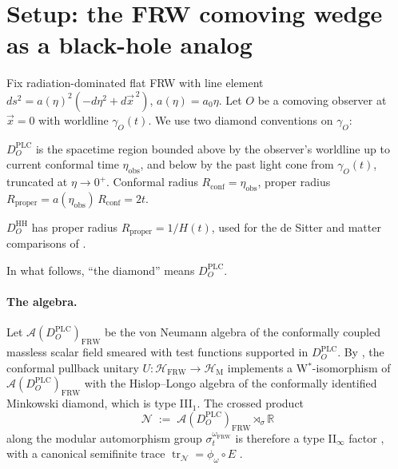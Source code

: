 \documentclass[11pt]{article}
\theoremstyle{definition}
\theoremstyle{remark}
\newcommand{\R}{\mathbb{R}}
\newcommand{\HH}{\mathcal{H}}
\newcommand{\N}{\mathcal{N}}
\renewcommand{\AA}{\mathcal{A}}
\newcommand{\tr}{\operatorname{tr}}
\newcommand{\FRW}{\mathrm{FRW}}
\newcommand{\Mink}{\mathrm{M}}
\newcommand{\PLC}{\mathrm{PLC}}
\begin{document}
\section{Setup: the FRW comoving wedge as a black-hole analog}
\label{sec:setup}

Fix radiation-dominated flat FRW with line element
$ds^2=a(\eta)^2(-d\eta^2+d\vec x^{\,2})$, $a(\eta)=a_0\eta$. Let $O$ be a
comoving observer at $\vec x=0$ with worldline $\gamma_O(t)$. We use two
diamond conventions on $\gamma_O$:
\begin{description}[leftmargin=2em,style=nextline]
\item[Past light-cone (PLC) diamond.] $D_O^{\PLC}$ is the spacetime
      region bounded above by the observer's worldline up to current
      conformal time $\eta_{\mathrm{obs}}$, and below by the past light cone
      from $\gamma_O(t)$, truncated at $\eta\to 0^+$. Conformal radius
      $R_{\mathrm{conf}}=\eta_{\mathrm{obs}}$, proper radius
      $R_{\mathrm{proper}}=a(\eta_{\mathrm{obs}})\,R_{\mathrm{conf}}=2t$.
\item[Hubble-horizon diamond.] $D_O^{\mathrm{HH}}$ has proper radius
      $R_{\mathrm{proper}}=1/H(t)$, used for the de Sitter and matter
      comparisons of \cite{piste1note}.
\end{description}
In what follows, ``the diamond'' means $D_O^{\PLC}$.

\paragraph{The algebra.} Let $\AA(D_O^{\PLC})_\FRW$ be the von Neumann
algebra of the conformally coupled massless scalar field smeared with
test functions supported in $D_O^{\PLC}$. By \cite[Thm.~3.5]{frwnote},
the conformal pullback unitary $U:\HH_\FRW\to\HH_\Mink$ implements a
W$^*$-isomorphism of $\AA(D_O^{\PLC})_\FRW$ with the Hislop--Longo
\cite{HislopLongo82} algebra of the conformally identified Minkowski
diamond, which is type III$_1$. The crossed product
\begin{equation}\label{eq:crossed}
  \N \;:=\; \AA(D_O^{\PLC})_\FRW\rtimes_\sigma\R
\end{equation}
along the modular automorphism group $\sigma_t^{\omega_\FRW}$ is therefore
a type II$_\infty$ factor \cite{Witten22CrossedProduct}, with a canonical
semifinite trace $\tr_\N=\phi_\omega\circ E$ \cite{ConnesTakesaki77}.
\end{document}
